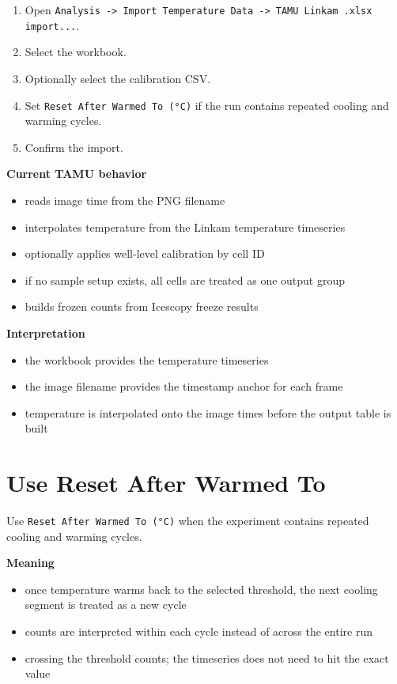 \documentclass[
  9pt,
  letterpaper,
  oneside,
  open=any,
  DIV=15,
  parskip=half-,
  headings=big,
  numbers=noenddot
]{scrbook}
\newcommand{\manuallead}[1]{%
  \vspace{0.15em}%
  {\sffamily\bfseries\color{ManualBlue}#1}\par\nobreak\vspace{0.05em}%
}
\begin{document}
\begin{enumerate}[leftmargin=*,itemsep=0.35em,topsep=0.4em]
\item Open \texttt{Analysis -> Import Temperature Data -> TAMU Linkam .xlsx import...}.
\item Select the workbook.
\item Optionally select the calibration CSV.
\item Set \texttt{Reset After Warmed To (°C)} if the run contains repeated cooling and warming cycles.
\item Confirm the import.
\end{enumerate}

\manuallead{Current TAMU behavior}

\begin{itemize}[leftmargin=*,itemsep=0.35em,topsep=0.4em]
\item reads image time from the PNG filename
\item interpolates temperature from the Linkam temperature timeseries
\item optionally applies well-level calibration by cell ID
\item if no sample setup exists, all cells are treated as one output group
\item builds frozen counts from Icescopy freeze results
\end{itemize}

\manuallead{Interpretation}

\begin{itemize}[leftmargin=*,itemsep=0.35em,topsep=0.4em]
\item the workbook provides the temperature timeseries
\item the image filename provides the timestamp anchor for each frame
\item temperature is interpolated onto the image times before the output table is built
\end{itemize}

\section{Use Reset After Warmed To}

Use \texttt{Reset After Warmed To (°C)} when the experiment contains repeated cooling and warming cycles.


\manuallead{Meaning}

\begin{itemize}[leftmargin=*,itemsep=0.35em,topsep=0.4em]
\item once temperature warms back to the selected threshold, the next cooling segment is treated as a new cycle
\item counts are interpreted within each cycle instead of across the entire run
\item crossing the threshold counts; the timeseries does not need to hit the exact value
\end{itemize}
\end{document}
